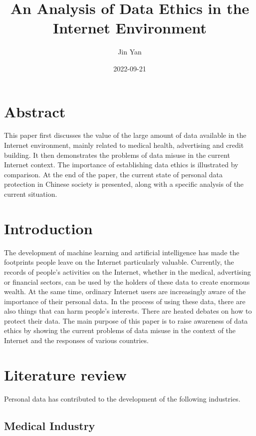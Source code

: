 \documentclass[
]{article}
\title{An Analysis of Data Ethics in the Internet Environment}
\author{Jin Yan}
\date{2022-09-21}
\begin{document}
\maketitle

\hypertarget{abstract}{%
\section{Abstract}\label{abstract}}

This paper first discusses the value of the large amount of data
available in the Internet environment, mainly related to medical health,
advertising and credit building. It then demonstrates the problems of
data misuse in the current Internet context. The importance of
establishing data ethics is illustrated by comparison. At the end of the
paper, the current state of personal data protection in Chinese society
is presented, along with a specific analysis of the current situation.

\hypertarget{introduction}{%
\section{Introduction}\label{introduction}}

The development of machine learning and artificial intelligence has made
the footprints people leave on the Internet particularly valuable.
Currently, the records of people's activities on the Internet, whether
in the medical, advertising or financial sectors, can be used by the
holders of these data to create enormous wealth. At the same time,
ordinary Internet users are increasingly aware of the importance of
their personal data. In the process of using these data, there are also
things that can harm people's interests. There are heated debates on how
to protect their data. The main purpose of this paper is to raise
awareness of data ethics by showing the current problems of data misuse
in the context of the Internet and the responses of various countries.

\hypertarget{literature-review}{%
\section{Literature review}\label{literature-review}}

Personal data has contributed to the development of the following
industries.

\hypertarget{medical-industry}{%
\subsection{Medical Industry}\label{medical-industry}}
\end{document}
